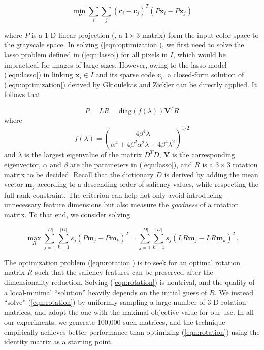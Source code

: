 \begin{equation}
\min_{P} \sum_i \sum_j (\mathbf{c}_i - \mathbf{c}_j)^T(P\mathbf{x}_i - P\mathbf{x}_j)
\label{eqn:optimization}
\end{equation}

\noindent where $P$ is a 1-D linear projection (\ie, a $1\times 3$ matrix) 
form the input color space to the grayscale space. 
In solving (\ref{eqn:optimization}), we first need to solve the lasso problem 
defined in (\ref{eqn:lasso}) for all pixels in $I$,
which would be impractical for images of large sizes. 
However, owing to the lasso model (\ref{eqn:lasso}) in linking $\mathbf{x}_i \in I$ 
and its sparse code $\mathbf{c}_i$, a closed-form solution of (\ref{eqn:optimization}) 
derived by Gkioulekas and Zickler \cite{Gkioulekas:2011:DRU} can be directly applied. 
It follows that

\begin{equation}
P = L R = \mathrm{diag}(f(\lambda)) \mathbf{V}^T R
\label{eqn:projection}
\end{equation}
\noindent where
\begin{equation}
f(\lambda) = \left(\frac{4\beta^4\lambda}{\alpha^4+4\beta^2\alpha^2\lambda+4\beta^4\lambda^2}\right)^{1/2}
\label{eqn:f}
\end{equation}
\noindent
and $\lambda$ is the largest eigenvalue of the matrix $D^TD$, 
$\mathbf{V}$ is the corresponding eigenvector, 
$\alpha$ and $\beta$ are the parameters in (\ref{eqn:lasso}), 
and $R$ is a $3 \times 3$ rotation matrix to be decided. 
Recall that the dictionary $D$ is derived by adding the mean vector $\mathbf{m}_j$ 
according to a descending order of saliency values, 
while respecting the full-rank constraint. 
The criterion can help not only avoid introducing unnecessary feature dimensions 
but also measure the {\em goodness} of a rotation matrix. 
To that end, we consider solving

\begin{equation}
\max_{R} \sum\limits_{j=1}^{|D|} \sum\limits_{k=1}^{|D|} s_j (P\mathbf{m}_j - P\mathbf{m}_k)^2 = \sum\limits_{j=1}^{|D|} \sum\limits_{k=1}^{|D|} s_j (LR\mathbf{m}_j - LR\mathbf{m}_k)^2\,.
\label{eqn:rotation}
\end{equation}

The optimization problem (\ref{eqn:rotation}) is to seek for an optimal rotation matrix $R$
such that the saliency features can be preserved after the dimensionality reduction. 
Solving (\ref{eqn:rotation}) is nontrival, and the quality of a local-minimal 
``solution'' heavily depends on the initial guess of $R$. 
We instead ``solve'' (\ref{eqn:rotation}) by uniformly sampling a large number of 
3-D rotation matrices, and adopt the one with the maximal objective value for our use. 
In all our experiments, we generate 100,000 such matrices, and the technique 
empirically achieves better performance than optimizing (\ref{eqn:rotation}) 
using the identity matrix as a starting point.
